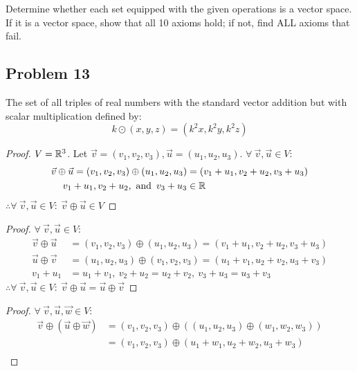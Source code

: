 




Determine whether each set equipped with the given operations is a vector space.
If it is a vector space, show that all 10 axioms hold; if not, find ALL axioms that fail.

\subsection*{Problem 13}
The set of all triples of real numbers with the standard vector addition but with scalar multiplication defined by:
\[
  k \odot (x,y,z) = (k^2x,k^2y,k^2z)
\]
\begin{enumerate}
  \begin{proof}
    $V = \mathbb{R}^3$. Let $\vec{v}=(v_1,v_2,v_3),\vec{u}=(u_1,u_2,u_3)$. $\forall~\vec{v},\vec{u} \in V$:
    \begin{align*}
      \vec{v} \oplus \vec{u} = (v_1,v_2,v_3) \oplus (u_1,u_2,u_3) & = (v_1+u_1,v_2+u_2,v_3+u_3) \\
      v_1+u_1,v_2+u_2, \operatorname{~\text{and}~} v_3+u_3                                     & \in \mathbb{R}
    \end{align*}
    $\therefore \forall~\vec{v},\vec{u} \in V:~\vec{v} \oplus \vec{u} \in V$
  \end{proof}
  \begin{proof}
    $\forall~\vec{v},\vec{u} \in V$:
    \begin{align*}
      \vec{v} \oplus \vec{u} & = (v_1,v_2,v_3) \oplus (u_1,u_2,u_3) = (v_1+u_1,v_2+u_2,v_3+u_3) \\
      \vec{u} \oplus \vec{v} & = (u_1,u_2,u_3) \oplus (v_1,v_2,v_3) = (u_1+v_1,u_2+v_2,u_3+v_3) \\
      v_1+u_1                & = u_1+v_1,~v_2+u_2 = u_2+v_2,~v_3+u_3 = u_3+v_3
    \end{align*}
    $\therefore \forall~\vec{v},\vec{u} \in V:~\vec{v} \oplus \vec{u} = \vec{u} \oplus \vec{v}$
  \end{proof}
  \begin{proof}
    $\forall~\vec{v},\vec{u},\vec{w} \in V$:
    \begin{align*}
      \vec{v} \oplus (\vec{u} \oplus \vec{w}) & = (v_1,v_2,v_3) \oplus ((u_1,u_2,u_3) \oplus (w_1,w_2,w_3)) \\
                                              & = (v_1,v_2,v_3) \oplus (u_1+w_1,u_2+w_2,u_3+w_3)            \\

\end{align*}
\end{proof}
\end{enumerate}
